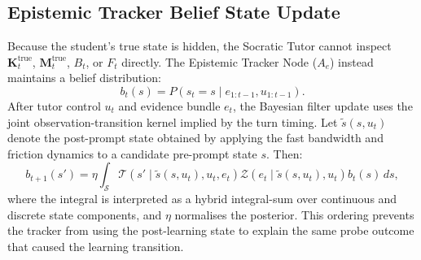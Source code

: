 \documentclass[11pt,a4paper]{report}
\begin{document}
\subsection{Epistemic Tracker Belief State Update}
Because the student's true state is hidden, the Socratic Tutor cannot inspect $\mathbf{K}_t^{\text{true}}$, $\mathbf{M}_t^{\text{true}}$, $B_t$, or $F_t$ directly. The Epistemic Tracker Node ($A_e$) instead maintains a belief distribution:
\begin{equation}
    b_t(s) = P(s_t=s \mid e_{1:t-1},u_{1:t-1}).
\end{equation}
After tutor control $u_t$ and evidence bundle $e_t$, the Bayesian filter update uses the joint observation-transition kernel implied by the turn timing. Let $\tilde{s}(s,u_t)$ denote the post-prompt state obtained by applying the fast bandwidth and friction dynamics to a candidate pre-prompt state $s$. Then:
\begin{equation}
    b_{t+1}(s') =
    \eta
    \int_{\mathcal{S}}
    \mathcal{T}\!\left(s' \mid \tilde{s}(s,u_t),u_t,e_t\right)
    \mathcal{Z}\!\left(e_t \mid \tilde{s}(s,u_t),u_t\right)
    b_t(s)\,ds,
\end{equation}
where the integral is interpreted as a hybrid integral-sum over continuous and discrete state components, and $\eta$ normalises the posterior. This ordering prevents the tracker from using the post-learning state to explain the same probe outcome that caused the learning transition.
\end{document}
